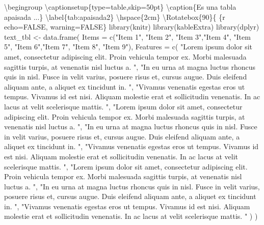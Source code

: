 \documentclass[11pt,a4paper,oneside,]{article}
\newenvironment{Shaded}{\begin{snugshade}}{\end{snugshade}}
\newcommand{\AttributeTok}[1]{\textcolor[rgb]{0.77,0.63,0.00}{#1}}
\newcommand{\DecValTok}[1]{\textcolor[rgb]{0.00,0.00,0.81}{#1}}
\newcommand{\NormalTok}[1]{#1}
\newcommand{\OtherTok}[1]{\textcolor[rgb]{0.56,0.35,0.01}{#1}}
\newcommand{\SpecialCharTok}[1]{\textcolor[rgb]{0.00,0.00,0.00}{#1}}
\newcommand{\StringTok}[1]{\textcolor[rgb]{0.31,0.60,0.02}{#1}}
\numberwithin{dummy}{section}
\theoremstyle{ocrenumbox}
\theoremstyle{blacknumex}
\theoremstyle{blacknumbox}
\theoremstyle{ocrenum}
\theoremstyle{ocrenum}
\begin{document}
\begin{Shaded}
\begin{Highlighting}[numbers=left,,firstnumber=701,]
\NormalTok{\textbackslash{}begingroup}
\NormalTok{\textbackslash{}captionsetup\{type}\OtherTok{=}\NormalTok{table,skip}\OtherTok{=}\NormalTok{50pt\}}
\NormalTok{\textbackslash{}caption\{Es una tabla apaisada ...\} \textbackslash{}label\{tab}\SpecialCharTok{:}\NormalTok{apaisada2\}}
\NormalTok{\textbackslash{}hspace\{2cm\}}
\NormalTok{\textbackslash{}Rotatebox\{}\DecValTok{90}\NormalTok{\}\{}
\StringTok{\textasciigrave{}\textasciigrave{}\textasciigrave{}}\AttributeTok{\{r echo=FALSE, warning=FALSE\}}
\AttributeTok{library(knitr)}
\AttributeTok{library(kableExtra)}
\AttributeTok{library(dplyr)}
\AttributeTok{text\_tbl \textless{}{-} data.frame(}
\AttributeTok{  Items = c("Item 1", "Item 2", "Item 3","Item 4", "Item 5", "Item 6","Item 7", "Item 8", "Item 9"), }
\AttributeTok{  Features = c(}
\AttributeTok{    "Lorem ipsum dolor sit amet, consectetur adipiscing elit.}
\AttributeTok{    Proin vehicula tempor ex. Morbi malesuada sagittis turpis,}
\AttributeTok{    at venenatis nisl luctus a. ",}
\AttributeTok{    "In eu urna at magna luctus rhoncus quis in nisl. Fusce in velit}
\AttributeTok{    varius, posuere risus et, cursus augue. Duis eleifend aliquam ante,}
\AttributeTok{    a aliquet ex tincidunt in. ",}
\AttributeTok{    "Vivamus venenatis egestas eros ut tempus. Vivamus id est nisi.}
\AttributeTok{    Aliquam molestie erat et sollicitudin venenatis. In ac lacus at}
\AttributeTok{    velit scelerisque mattis. ",}
\AttributeTok{    "Lorem ipsum dolor sit amet, consectetur adipiscing elit.}
\AttributeTok{    Proin vehicula tempor ex. Morbi malesuada sagittis turpis,}
\AttributeTok{    at venenatis nisl luctus a. ",}
\AttributeTok{    "In eu urna at magna luctus rhoncus quis in nisl. Fusce in velit}
\AttributeTok{    varius, posuere risus et, cursus augue. Duis eleifend aliquam ante,}
\AttributeTok{    a aliquet ex tincidunt in. ",}
\AttributeTok{    "Vivamus venenatis egestas eros ut tempus. Vivamus id est nisi.}
\AttributeTok{    Aliquam molestie erat et sollicitudin venenatis. In ac lacus at}
\AttributeTok{    velit scelerisque mattis. ",}
\AttributeTok{    "Lorem ipsum dolor sit amet, consectetur adipiscing elit.}
\AttributeTok{    Proin vehicula tempor ex. Morbi malesuada sagittis turpis,}
\AttributeTok{    at venenatis nisl luctus a. ",}
\AttributeTok{    "In eu urna at magna luctus rhoncus quis in nisl. Fusce in velit}
\AttributeTok{    varius, posuere risus et, cursus augue. Duis eleifend aliquam ante,}
\AttributeTok{    a aliquet ex tincidunt in. ",}
\AttributeTok{    "Vivamus venenatis egestas eros ut tempus. Vivamus id est nisi.}
\AttributeTok{    Aliquam molestie erat et sollicitudin venenatis. In ac lacus at}
\AttributeTok{    velit scelerisque mattis. "}
\AttributeTok{    ) }
\AttributeTok{  )}


\end{Highlighting}
\end{Shaded}
\end{document}
